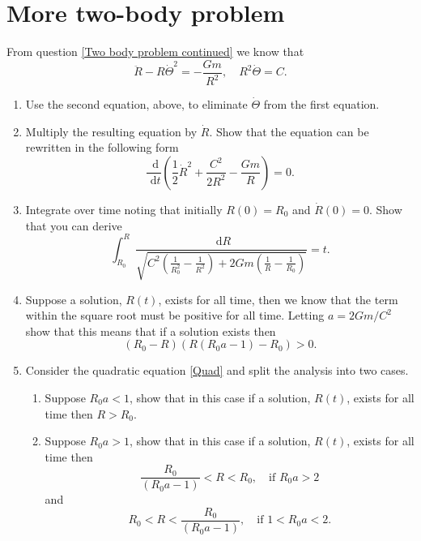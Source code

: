 \documentclass[]{article}
\newcommand{\bb}{\begin{equation}}
\newcommand{\ee}{\end{equation}}
\newcommand{\rd}{\text{ d}}
\newcommand{\eqn}[1]{equation \eqref{#1}}
\renewcommand{\l}{\left(}
\renewcommand{\r}{\right)}
\begin{document}
\section{More two-body problem}
From question \ref{Two body problem continued} we know that 
\bb
\ddot{R}-R\dot{\Theta}^2=-\frac{Gm}{R^2},\quad R^2\dot{\Theta}=C.
\ee
\begin{enumerate}
\item Use the second equation, above, to eliminate $\dot{\Theta}$ from the first equation.
\item Multiply the resulting equation by $\dot{R}$. Show that the equation can be rewritten in the following form
\bb
\frac{\rd}{\rd t}\l\frac{1}{2}\dot{R}^2+\frac{C^2}{2R^2}-\frac{Gm}{R}\r=0.
\ee
\item Integrate over time noting that initially $R(0)=R_0$ and $\dot{R}(0)=0$. Show that you can derive
\bb
\int^R_{R_0}\frac{\rd R}{\sqrt{C^2\l\frac{1}{R_0^2}-\frac{1}{R^2}\r+2Gm\l\frac{1}{R}-\frac{1}{R_0}\r}}=t.
\ee
\item Suppose a solution, $R(t)$, exists for all time, then we know that the term within the square root must be positive for all time. Letting $a=2Gm/C^2$ show that this means that if a solution exists then
\bb
(R_0-R)(R(R_0a-1)-R_0)>0.\label{Quad}
\ee
\item Consider the quadratic \eqn{Quad} and split the analysis into two cases.
\begin{enumerate}
\item Suppose $R_0a<1$, show that in this case if a solution, $R(t)$, exists for all time then $R>R_0$.
\item Suppose $R_0a>1$, show that in this case if a solution, $R(t)$, exists for all time then
\bb
\frac{R_0}{(R_0a-1)}<R<R_0, \quad \textrm{if $R_0a>2$} 
\ee
 and
\bb
R_0<R<\frac{R_0}{(R_0a-1)},\quad \textrm{if $1<R_0a<2$.}
\ee
\end{enumerate}
\end{enumerate}
\end{document}
